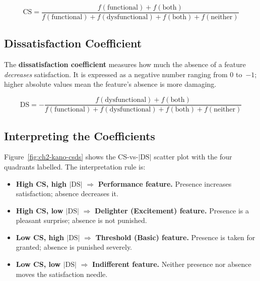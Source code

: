 \begin{equation}
  \mathrm{CS} = \frac{f(\text{functional}) + f(\text{both})}
                     {f(\text{functional}) + f(\text{dysfunctional}) +
                      f(\text{both}) + f(\text{neither})}
  \label{eq:ch2-cs}
\end{equation}

\subsection{Dissatisfaction Coefficient}
\label{subsec:ch2-ds}

The \textbf{dissatisfaction coefficient} measures how much the absence
of a feature \emph{decreases} satisfaction.
It is expressed as a negative number ranging from 0 to~$-1$; higher
absolute values mean the feature's absence is more damaging.

\begin{equation}
  \mathrm{DS} = -\frac{f(\text{dysfunctional}) + f(\text{both})}
                      {f(\text{functional}) + f(\text{dysfunctional}) +
                       f(\text{both}) + f(\text{neither})}
  \label{eq:ch2-ds}
\end{equation}

\subsection{Interpreting the Coefficients}
\label{subsec:ch2-interpretation}

Figure~\ref{fig:ch2-kano-csds} shows the CS-vs-$|\mathrm{DS}|$ scatter
plot with the four quadrants labelled.
The interpretation rule is:

\begin{itemize}
  \item \textbf{High CS, high $|\mathrm{DS}|$} $\Rightarrow$
        \textbf{Performance feature.}
        Presence increases satisfaction; absence decreases it.
  \item \textbf{High CS, low $|\mathrm{DS}|$} $\Rightarrow$
        \textbf{Delighter (Excitement) feature.}
        Presence is a pleasant surprise; absence is not punished.
  \item \textbf{Low CS, high $|\mathrm{DS}|$} $\Rightarrow$
        \textbf{Threshold (Basic) feature.}
        Presence is taken for granted; absence is punished severely.
  \item \textbf{Low CS, low $|\mathrm{DS}|$} $\Rightarrow$
        \textbf{Indifferent feature.}
        Neither presence nor absence moves the satisfaction needle.
\end{itemize}

